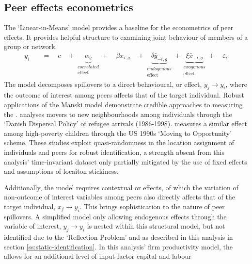 \subsection{Peer effects econometrics}
\label{ss:lit-peer-effects-metrics}

The \cite{Manski1993} `Linear-in-Means' model provides a baseline for the econometrics of peer effects.
It provides helpful structure to examining joint behaviour of members of a group or network.
\begin{align*}
    y_i \quad
        &=\quad c \quad
        + \underbrace{\alpha_g}         _{\substack{correlated \\\text{effect}}}
        + \quad\beta x_{i,g}\quad
        + \underbrace{\delta\bar y_{-i,g}}_{\substack{endogenous \\\text{effect}}}
        + \underbrace{\xi\bar x_{-i,g}}   _{\substack{exogenous  \\\text{effect}}}
        + \quad \varepsilon_i
\end{align*}
The model  decomposes spillovers to a direct behavioural, or  effect,
$y_{j}\to y_{i}$, where the outcome of interest among peers
affects that of the target individual.
Robust applications of the Manski model demonstrate credible approaches to measuring the .
\cite{dustmann-damm2024:neighbourhoods} analyses movers to new neighbourhoods among individuals through
the `Danish Dispersal Policy' of refugee arrivals (1986-1998).
\cite{Chetty2016} measures a similar effect among high-poverty children through the US 1990s `Moving to Opportunity' scheme.
These studies exploit quasi-randomness in the location assignment of individuals and peers
for robust identification, a strength absent from this analysis' time-invariant dataset only partially mitigated by the use of fixed effects
and assumptions of locaiton stickiness.
\par
Additionally, the \cite{Manski1993} model requires contextual or  effects,
of which the variation of non-outcome of interest variables among peers
also directly affects that of the target individual, $x_j \to y_i$.
This brings sophistication to the nature of peer spillovers.
A simplified model only allowing endogenous effects through the variable of interest, $y_j \to y_i$
is nested within this structural model, but not identified due to the `Reflection Problem'
and as described in this analysis in section \ref{ss:static-identification}.
In this analysis' firm productivity model, the 
allows for an additional level of input factor capital and labour
